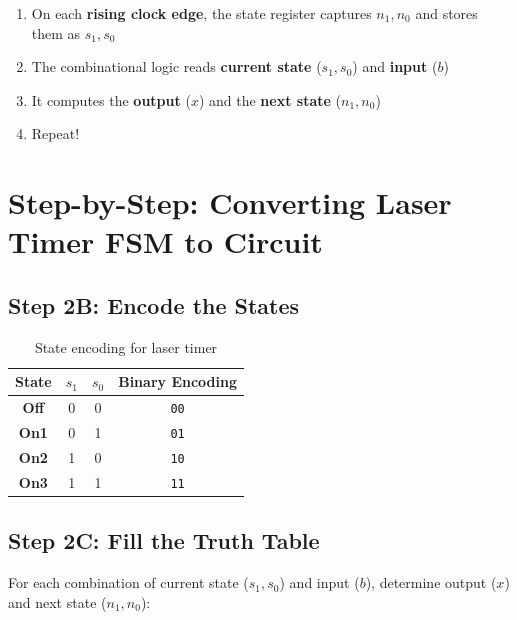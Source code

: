 \documentclass[12pt, a4paper]{article}
\begin{document}
\begin{keypoint}
  \begin{enumerate}
    \item On each \textbf{rising clock edge}, the state register captures $n_1, n_0$ and stores them as $s_1, s_0$
    \item The combinational logic reads \textbf{current state} ($s_1, s_0$) and \textbf{input} ($b$)
    \item It computes the \textbf{output} ($x$) and the \textbf{next state} ($n_1, n_0$)
    \item Repeat!
  \end{enumerate}
\end{keypoint}

\section{Step-by-Step: Converting Laser Timer FSM to Circuit}

\subsection{Step 2B: Encode the States}

\begin{table}[H]
\centering
\renewcommand{\arraystretch}{1.3}
\begin{tabular}{@{} >{\bfseries}c c c c @{}}
  \toprule
  State & $s_1$ & $s_0$ & Binary Encoding \\
  \midrule
  Off & 0 & 0 & \texttt{00} \\
  On1 & 0 & 1 & \texttt{01} \\
  On2 & 1 & 0 & \texttt{10} \\
  On3 & 1 & 1 & \texttt{11} \\
  \bottomrule
\end{tabular}
\caption{State encoding for laser timer}
\end{table}

\subsection{Step 2C: Fill the Truth Table}

For each combination of current state ($s_1, s_0$) and input ($b$), determine output ($x$) and next state ($n_1, n_0$):
\end{document}

